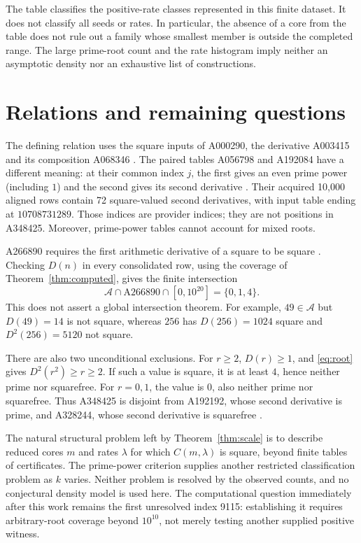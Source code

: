 \documentclass[11pt]{article}
\theoremstyle{definition}
\theoremstyle{remark}
\begin{document}
The table classifies the positive-rate classes represented in this
finite dataset. It does not classify all seeds or rates. In particular,
the absence of a core from the table does not rule out a family whose
smallest member is outside the completed range. The large prime-root
count and the rate histogram imply neither an asymptotic density nor
an exhaustive list of constructions.

\section{Relations and remaining questions}\label{sec:relations}
The defining relation uses the square inputs of A000290, the derivative
A003415 and its composition A068346 \cite{squares,derivative,second}. The paired tables
A056798 and A192084 have a different meaning: at their common index
$j$, the first gives an even prime power (including $1$) and the
second gives its second derivative \cite{evenpower,powersecond}. Their acquired 10,000 aligned
rows contain 72 square-valued second derivatives, with input table
ending at $10708731289$. Those indices are provider indices; they are
not positions in A348425. Moreover, prime-power tables cannot account
for mixed roots.

A266890 requires the first arithmetic derivative of a square to be
square \cite{firstsquare}. Checking $D(n)$ in every consolidated row,
using the coverage of Theorem~\ref{thm:computed}, gives
the finite intersection
\[
 \mathcal A\cap\mathrm{A266890}\cap[0,10^{20}]=\{0,1,4\}.
\]
This does not assert a global intersection theorem. For example,
$49\in\mathcal A$ but $D(49)=14$ is not square, whereas $256$ has
$D(256)=1024$ square and $D^{2}(256)=5120$ not square.

There are also two unconditional exclusions. For $r\geq2$,
$D(r)\geq1$, and \eqref{eq:root} gives $D^{2}(r^{2})\geq r\geq2$.
If such a value is square, it is at least $4$, hence neither prime
nor squarefree. For $r=0,1$, the value is $0$, also neither prime
nor squarefree. Thus A348425 is disjoint from A192192, whose second
derivative is prime, and A328244, whose second derivative is squarefree
\cite{prime2,sfree2}.

The natural structural problem left by Theorem~\ref{thm:scale} is to
describe reduced cores $m$ and rates $\lambda$ for which
$C(m,\lambda)$ is square, beyond finite tables of certificates.
The prime-power criterion supplies another restricted classification
problem as $k$ varies. Neither problem is resolved by the observed
counts, and no conjectural density model is used here. The computational
question immediately after this work remains the first unresolved
index 9115: establishing it requires arbitrary-root coverage beyond
$10^{10}$, not merely testing another supplied positive witness.
\end{document}
